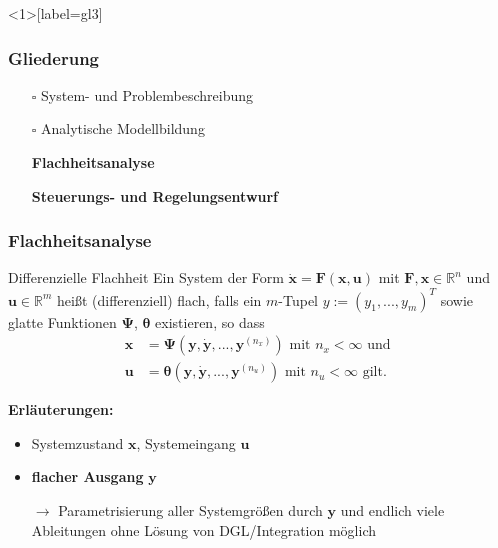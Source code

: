 \documentclass[
	ngerman,
	10pt,				%
	aspectratio=169 	%
]{beamer}
\newcommand{\cdbox}{$\square$\hspace{-0.65em}\raisebox{0.1em}{\checkmark}\hspace{-0.18em}}
\begin{document}

\begin{frame}<1>[label=gl3]
	\frametitle{Gliederung}
	\begin{itemize}
		\item[\cdbox] System- und Problembeschreibung
		\item[\cdbox] Analytische Modellbildung
		\item[\only<1>{$\rightarrow$}\only<2>{$\rightarrow$}\only<3->{\cdbox}]
		\textbf<1>{Flachheitsanalyse}
		\item[\only<1-2>{$\square$}\only<3>{$\rightarrow$}\only<4->{\cdbox}]
		\textbf<2>{Steuerungs- und Regelungsentwurf}
	\end{itemize}
\end{frame}


\begin{frame}[label=Flachheit_1]
	\frametitle{Flachheitsanalyse}
   	\begin{block}{Differenzielle Flachheit}
	Ein System der Form $\dot{\mathbf{x}} = \mathbf{F}(\mathbf{x}, \mathbf{u})$ mit $\mathbf{F}, \mathbf{x} \in \mathbb{R}^n$ und $\mathbf{u} \in \mathbb{R}^m$ heißt (differenziell) flach, falls ein $m$-Tupel $y := (y_1, ..., y_m)^T$ sowie glatte Funktionen $\mathbf{\Psi}$, $\boldsymbol{\theta}$ existieren, so dass
	\begin{align*}
			\mathbf{x} &= \mathbf{\Psi}(\mathbf{y}, \dot{\mathbf{y}}, ..., \mathbf{y}^{(n_x)}) \text{ mit } n_x < \infty \text{ und } \\
			\mathbf{u} &= \boldsymbol{\theta}(\mathbf{y}, \dot{\mathbf{y}}, ..., \mathbf{y}^{(n_u)}) \text{ mit } n_u < \infty \text{ gilt.}
	\end{align*}
	\end{block}

	\pause
	\bigskip
	\textbf{Erläuterungen:}
	\begin{itemize}
		\item Systemzustand $\mathbf{x}$, Systemeingang $\mathbf{u}$ 
		\item \textbf{flacher Ausgang} $\mathbf{y}$
		\item[$\rightarrow$] Parametrisierung aller Systemgrößen durch $\mathbf{y}$ und endlich viele Ableitungen ohne Lösung von DGL/Integration möglich
	\end{itemize}
\end{frame}
\end{document}
